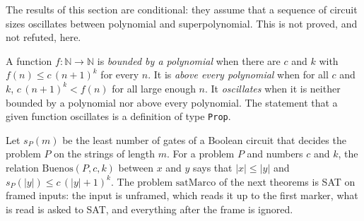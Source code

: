 The results of this section are conditional: they assume that a sequence of circuit sizes oscillates
between polynomial and superpolynomial. This is not proved, and not refuted, here.

\begin{definition}
  \label{def:arithmetic-hyp-oscillation}
  \leanok
  \own{}
  A function $f : \mathbb{N} \to \mathbb{N}$ is \emph{bounded by a polynomial} when there are $c$ and
  $k$ with $f(n) \le c\,(n + 1)^k$ for every $n$. It is \emph{above every polynomial} when for all $c$
  and $k$, $c\,(n + 1)^k < f(n)$ for all large enough $n$. It \emph{oscillates} when it is neither
  bounded by a polynomial nor above every polynomial. The statement that a given function oscillates
  is a definition of type \texttt{Prop}.
\end{definition}

\begin{definition}
  \label{def:arithmetic-good-lengths}
  \leanok
  \own{}
  Let $s_P(m)$ be the least number of gates of a Boolean circuit that decides the problem $P$ on the
  strings of length $m$. For a problem $P$ and numbers $c$ and $k$, the relation $\mathrm{Buenos}(P,
  c, k)$ between $x$ and $y$ says that $|x| \le |y|$ and $s_P(|y|) \le c\,(|y| + 1)^k$. The problem
  $\mathrm{satMarco}$ of the next theorems is SAT on framed inputs: the input is unframed, which
  reads it up to the first marker, what is read is asked to SAT, and everything after the frame is
  ignored.
\end{definition}

